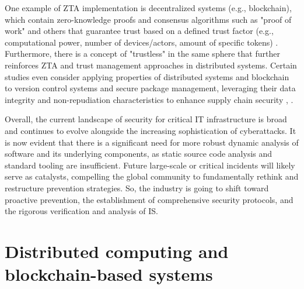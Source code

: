 One example of ZTA implementation is decentralized systems (e.g., blockchain), which contain zero-knowledge proofs and consensus algorithms such as "proof of work" and others that guarantee trust based on a defined trust factor (e.g., computational power, number of devices/actors, amount of specific tokens) \cite{bangui2024when}. Furthermore, there is a concept of "trustless" in the same sphere that further reinforces ZTA and trust management approaches in distributed systems. Certain studies even consider applying properties of distributed systems and blockchain to version control systems and secure package management, leveraging their data integrity and non-repudiation characteristics to enhance supply chain security \cite[pp. 8–12]{hammi2023software}, \cite{grilli2024combining}.

Overall, the current landscape of security for critical IT infrastructure is broad and continues to evolve alongside the increasing sophistication of cyberattacks. It is now evident that there is a significant need for more robust dynamic analysis of software and its underlying components, as static source code analysis and standard tooling are insufficient. Future large-scale or critical incidents will likely serve as catalysts, compelling the global community to fundamentally rethink and restructure prevention strategies. So, the industry is going to shift toward proactive prevention, the establishment of comprehensive security protocols, and the rigorous verification and analysis of IS.

\section{Distributed computing and blockchain-based systems}

